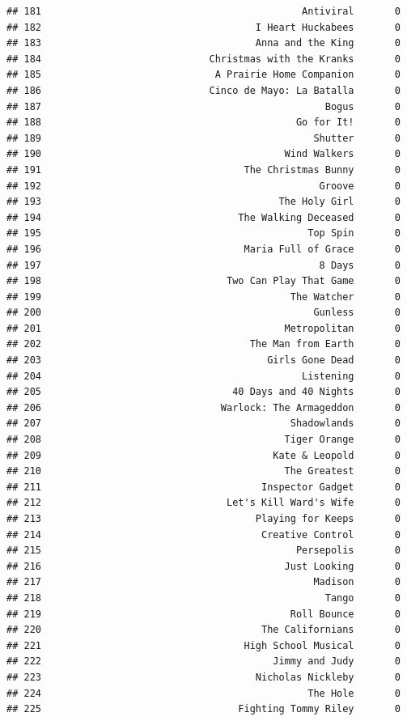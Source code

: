 \documentclass[
]{article}
\begin{document}
\begin{verbatim}
## 181                                             Antiviral       0
## 182                                     I Heart Huckabees       0
## 183                                     Anna and the King       0
## 184                             Christmas with the Kranks       0
## 185                              A Prairie Home Companion       0
## 186                             Cinco de Mayo: La Batalla       0
## 187                                                 Bogus       0
## 188                                            Go for It!       0
## 189                                               Shutter       0
## 190                                          Wind Walkers       0
## 191                                   The Christmas Bunny       0
## 192                                                Groove       0
## 193                                         The Holy Girl       0
## 194                                  The Walking Deceased       0
## 195                                              Top Spin       0
## 196                                   Maria Full of Grace       0
## 197                                                8 Days       0
## 198                                Two Can Play That Game       0
## 199                                           The Watcher       0
## 200                                               Gunless       0
## 201                                          Metropolitan       0
## 202                                    The Man from Earth       0
## 203                                       Girls Gone Dead       0
## 204                                             Listening       0
## 205                                 40 Days and 40 Nights       0
## 206                               Warlock: The Armageddon       0
## 207                                           Shadowlands       0
## 208                                          Tiger Orange       0
## 209                                        Kate & Leopold       0
## 210                                          The Greatest       0
## 211                                      Inspector Gadget       0
## 212                                Let's Kill Ward's Wife       0
## 213                                     Playing for Keeps       0
## 214                                      Creative Control       0
## 215                                            Persepolis       0
## 216                                          Just Looking       0
## 217                                               Madison       0
## 218                                                 Tango       0
## 219                                           Roll Bounce       0
## 220                                      The Californians       0
## 221                                   High School Musical       0
## 222                                        Jimmy and Judy       0
## 223                                     Nicholas Nickleby       0
## 224                                              The Hole       0
## 225                                  Fighting Tommy Riley       0
\end{verbatim}
\end{document}
